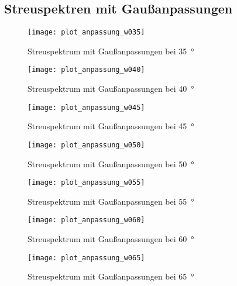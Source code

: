 \documentclass[11pt, ngerman, fleqn, DIV=15, headinclude, BCOR=2cm]{scrreprt}
\begin{document}
\begin{appendix}
\clearpage

\subsection{Streuspektren mit Gaußanpassungen}
\label{anhang-streuspektren-gauss}
\begin{figure}[h]
    \centering
    \texttt{[image: plot\_anpassung\_w035]}
    \caption{%
	    Streuspektrum mit Gaußanpassungen bei \SI{35}{\degree}
    }
    \label{fig:plot_anpassung_w035}
\end{figure}

\begin{figure}[h]
    \centering
    \texttt{[image: plot\_anpassung\_w040]}
    \caption{%
	    Streuspektrum mit Gaußanpassungen bei \SI{40}{\degree}
    }
    \label{fig:plot_anpassung_w040}
\end{figure}

\begin{figure}[h]
    \centering
    \texttt{[image: plot\_anpassung\_w045]}
    \caption{%
	    Streuspektrum mit Gaußanpassungen bei \SI{45}{\degree}
    }
    \label{fig:plot_anpassung_w045}
\end{figure}

\begin{figure}[h]
    \centering
    \texttt{[image: plot\_anpassung\_w050]}
    \caption{%
	    Streuspektrum mit Gaußanpassungen bei \SI{50}{\degree}
    }
    \label{fig:plot_anpassung_w050}
\end{figure}

\begin{figure}[h]
    \centering
    \texttt{[image: plot\_anpassung\_w055]}
    \caption{%
	    Streuspektrum mit Gaußanpassungen bei \SI{55}{\degree}
    }
    \label{fig:plot_anpassung_w055}
\end{figure}

\begin{figure}[h]
    \centering
    \texttt{[image: plot\_anpassung\_w060]}
    \caption{%
	    Streuspektrum mit Gaußanpassungen bei \SI{60}{\degree}
    }
    \label{fig:plot_anpassung_w060}
\end{figure}

\begin{figure}[h]
    \centering
    \texttt{[image: plot\_anpassung\_w065]}
    \caption{%
	    Streuspektrum mit Gaußanpassungen bei \SI{65}{\degree}
    }
    \label{fig:plot_anpassung_w065}
\end{figure}


\end{appendix}
\end{document}
